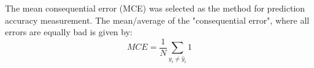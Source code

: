 \documentclass{article}
\begin{document}
The mean consequential error (MCE) was selected as the method for prediction accuracy measurement. The mean/average of the "consequential error", where all errors are equally bad is given by:  
$$ MCE = \frac{1}{N} \sum_{y_i \neq \hat{y}_i} 1$$

\end{document}
